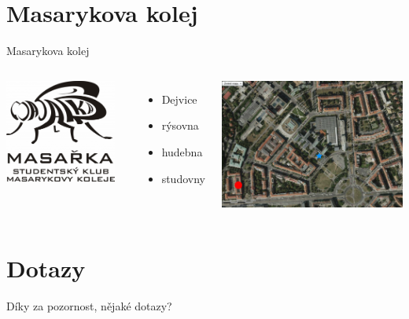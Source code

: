 \documentclass{beamer}
\begin{document}
\section{Masarykova kolej}
\begin{frame}{Masarykova kolej}
	\begin{columns}[c]
			\begin{center}
				\includegraphics[width=0.9\textwidth]{logo_mk.png}
			\end{center}

			\begin{itemize}
				\item Dejvice
				\item rýsovna
				\item hudebna
				\item studovny
			\end{itemize}
			\begin{center}
				\includegraphics[width=\textwidth]{mapa_mk.png}
			\end{center}
	\end{columns}

\end{frame}

\section{Dotazy}
\begin{frame}
	\begin{center}
	Díky za pozornost,
	nějaké dotazy?
	\end{center}
\end{frame}
\end{document}
